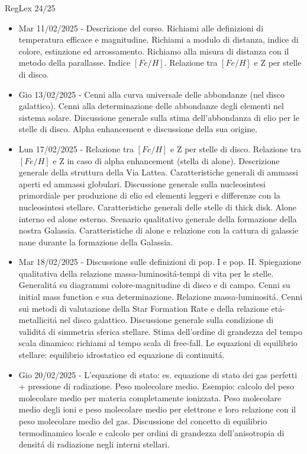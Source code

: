 \begin{frame}{RegLex 24/25}
    \begin{itemize}
\item Mar 11/02/2025 - Descrizione del corso. Richiami alle definizioni di temperatura efficace e magnitudine. Richiami a modulo di distanza, indice di colore, estinzione ed arrossamento. Richiamo alla misura di distanza con il metodo della parallasse. Indice $[Fe/H]$. Relazione tra $[Fe/H]$ e Z per stelle di disco.
\item Gio 13/02/2025 - Cenni alla curva universale delle abbondanze (nel disco galattico). Cenni alla determinazione delle abbondanze degli elementi nel sistema solare. Discussione generale sulla stima dell'abbondanza di elio per le stelle di disco. Alpha enhancement e discussione della sua origine.
\item Lun 17/02/2025 - Relazione tra $[Fe/H]$ e Z per stelle di disco. Relazione tra $[Fe/H]$ e Z in caso di alpha enhancement (stella di alone). Descrizione generale della struttura della Via Lattea. Caratteristiche generali di ammassi aperti ed ammassi globulari. Discussione generale sulla nucleosintesi primordiale per produzione di elio ed elementi leggeri e differenze con la nucleosintesi stellare. Caratteristiche generali delle stelle di thick disk. Alone interno ed alone esterno. Scenario qualitativo generale della formazione della nostra Galassia. Caratteristiche di alone e relazione con la cattura di galassie nane durante la formazione della Galassia.
\item Mar 18/02/2025 - Discussione sulle definizioni di pop. I e pop. II. Spiegazione qualitativa della relazione massa-luminosit\'a-tempi di vita per le stelle. Generalit\'a su diagrammi colore-magnitudine di disco e di campo. Cenni su initial mass function e sua determinazione. Relazione massa-luminosit\'a. Cenni sui metodi di valutazione della Star Formation Rate e della relazione et\'a-metallicit\'a nel disco galattico. Discussione generale sulla condizione di validit\'a di simmetria sferica stellare. Stima dell'ordine di grandezza del tempo scala dinamico: richiami al tempo scala di free-fall. Le equazioni di equilibrio stellare: equilibrio idrostatico ed equazione di continuit\'a.
\item Gio 20/02/2025 - L'equazione di stato: es. equazione di stato dei gas perfetti + pressione di radiazione. Peso molecolare medio. Esempio: calcolo del peso molecolare medio per materia completamente ionizzata. Peso molecolare medio degli ioni e peso molecolare medio per elettrone e loro relazione con il peso molecolare medio del gas. Discussione del concetto di equilibrio termodinamico locale e calcolo per ordini di grandezza dell'anisotropia di densit\'a di radiazione negli interni stellari.

\end{itemize}
\end{frame}
